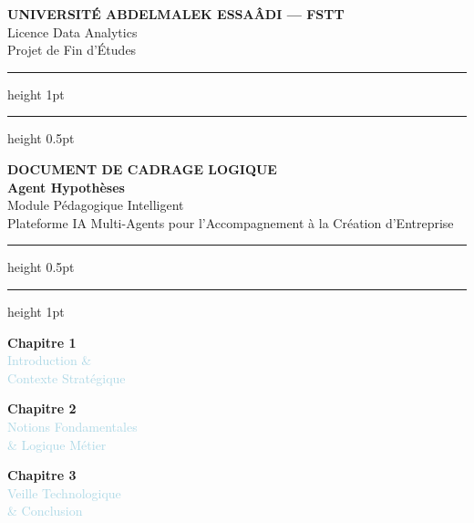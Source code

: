 \documentclass[12pt, a4paper]{report}
\begin{document}
\onehalfspacing

\begin{titlepage}
\pagecolor{navyblue}
\color{white}
\begin{center}

\vspace*{1.5cm}

{\small\bfseries\color{lightblue} UNIVERSITÉ ABDELMALEK ESSAÂDI — FSTT}\\[4pt]
{\small\color{lightblue} Licence Data Analytics}\\[6pt]
{\small\color{lightblue} Projet de Fin d'Études}

\vspace{1.2cm}
\textcolor{midblue}{\hrule height 1pt}
\vspace{0.3cm}
\textcolor{rulegray}{\hrule height 0.5pt}
\vspace{1.2cm}

{\fontsize{13}{18}\selectfont\bfseries\color{lightblue}
DOCUMENT DE CADRAGE LOGIQUE}\\[10pt]

{\fontsize{26}{34}\selectfont\bfseries\color{white}
Agent Hypothèses}\\[14pt]

{\fontsize{14}{20}\selectfont\color{lightblue}
Module Pédagogique Intelligent}\\[6pt]

{\fontsize{11}{16}\selectfont\color{rulegray}
Plateforme IA Multi-Agents pour l'Accompagnement à la Création d'Entreprise}

\vspace{1.2cm}
\textcolor{rulegray}{\hrule height 0.5pt}
\vspace{0.3cm}
\textcolor{midblue}{\hrule height 1pt}
\vspace{1.8cm}

\begin{minipage}{0.3\textwidth}
\centering
\textcolor{midblue}{\large\bfseries Chapitre 1}\\[4pt]
\textcolor{lightblue}{\small Introduction \&\\Contexte Stratégique}
\end{minipage}
\hfill
\begin{minipage}{0.3\textwidth}
\centering
\textcolor{midblue}{\large\bfseries Chapitre 2}\\[4pt]
\textcolor{lightblue}{\small Notions Fondamentales\\\& Logique Métier}
\end{minipage}
\hfill
\begin{minipage}{0.3\textwidth}
\centering
\textcolor{midblue}{\large\bfseries Chapitre 3}\\[4pt]
\textcolor{lightblue}{\small Veille Technologique\\\& Conclusion}
\end{minipage}


\end{center}
\end{titlepage}
\end{document}
